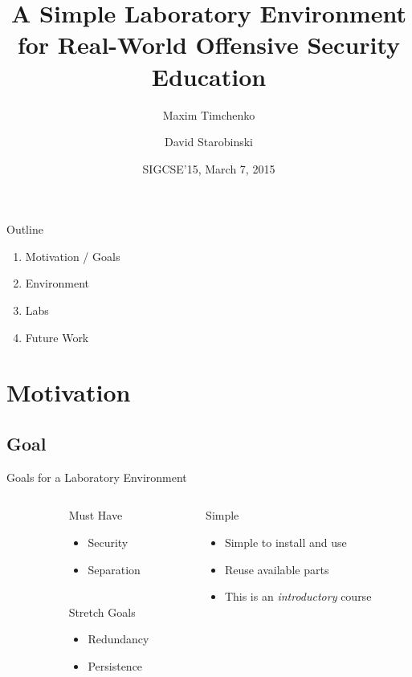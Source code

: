 \documentclass{beamer}
\title{A Simple Laboratory Environment \\for Real-World Offensive Security Education}
\author{Maxim Timchenko \and David Starobinski}
\institute{Electrical and Computer Engineering Department\\Boston University}
\date{SIGCSE'15, March 7, 2015}
\begin{document}
	\begin{frame}
		\titlepage
	\end{frame}
	
	\begin{frame}{Outline}
		\begin{enumerate}
			\item Motivation / Goals
			\item Environment
			\item Labs
			\item Future Work
		\end{enumerate}
	\end{frame}
	
	\section{Motivation}
	\subsection{Goal}
	
	\begin{frame}{Goals for a Laboratory Environment}
		\begin{center}
    		\begin{columns}[t]
		\begin{column}{0.1\textwidth}
		~
		\end{column}
     		\begin{column}{0.4\textwidth}
            		Must Have
            		\begin{itemize}
            			\item Security
            			\item Separation
            		\end{itemize}		
			~\\		
            		Stretch Goals
            		\begin{itemize}
            			\item Redundancy
            			\item Persistence
            		\end{itemize}			
      		\end{column}
    
    		\begin{column}{0.5\textwidth}
			Simple
			\begin{itemize}
				\item Simple to install and use
				\item Reuse available parts
				\item This is an {\em introductory} course
			\end{itemize}				
      		\end{column}
    		\end{columns}			
		\end{center}
	\end{frame}
\end{document}
